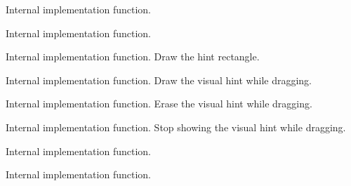 Internal implementation function.


\label{cbbardragplugincliprectinframe}


Internal implementation function.


\label{cbbardragplugindodrawhintrect}


Internal implementation function.
Draw the hint rectangle.


\label{cbbardragplugindrawhintrect}


Internal implementation function.
Draw the visual hint while dragging.


\label{cbbardragpluginerasehintrect}


Internal implementation function.
Erase the visual hint while dragging.


\label{cbbardragpluginfinishtracking}


Internal implementation function.
Stop showing the visual hint while dragging.


\label{cbbardragplugingetbarheightinpane}


Internal implementation function.


\label{cbbardragplugingetbarwidthinpane}


Internal implementation function.


\label{cbbardragplugingetdistancetopane}


